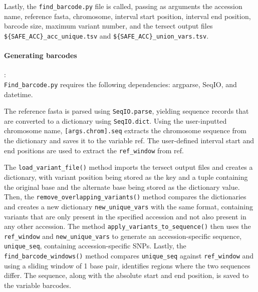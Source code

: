 \documentclass[12pt]{article}
\begin{document}
\begin{itemize}
Lastly, the \verb+find_barcode.py+ file is called, passing as arguments the accession name, reference fasta, chromosome, interval start position, interval end position, barcode size, maximum variant number, and the tersect output files  \verb+${SAFE_ACC}_acc_unique.tsv+ and  \verb+${SAFE_ACC}_union_vars.tsv+. 

\paragraph{Generating barcodes}: \\
\verb+Find_barcode.py+ requires the following dependencies: argparse, SeqIO, and datetime.  

The reference fasta is parsed using \verb+SeqIO.parse+, yielding sequence records that are converted to a dictionary using \verb+SeqIO.dict+. Using the user-inputted chromosome name, \verb+[args.chrom].seq+ extracts the chromosome sequence from the dictionary and saves it to the variable ref. The user-defined interval start and end positions are used to extract the \verb+ref_window+ from ref. 

The \verb+load_variant_file()+ method imports the tersect output files and creates a dictionary, with variant position being stored as the key and a tuple containing the original base and the alternate base being stored as the dictionary value. Then, the \verb+remove_overlapping_variants()+ method compares the dictionaries and creates a new dictionary \verb+new_unique_vars+ with the same format, containing variants that are only present in the specified accession and not also present in any other accession. The method \verb+apply_variants_to_sequence()+ then uses the \verb+ref_window+ and \verb+new_unique_vars+ to generate an accession-specific sequence, \verb+unique_seq+, containing accession-specific SNPs. Lastly, the \verb+find_barcode_windows()+ method compares \verb+unique_seq+ against \verb+ref_window+ and using a sliding window of 1 base pair, identifies regions where the two sequences differ. The sequence, along with the absolute start and end position, is saved to the variable barcodes.  


\end{itemize}
\end{document}
